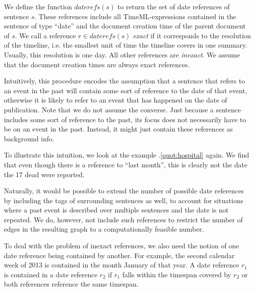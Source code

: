 \documentclass[a4paper,BCOR=10mm]{report}
\numberwithin{lemma}{chapter}
\numberwithin{definition}{chapter}
\begin{document}
We define the function $\mathit{daterefs}(s)$ to return the set of date references of sentence $s$. These references include all TimeML-expressions \citep{timeml} contained in the sentence of type ``date'' and the document creation time of the parent document of $s$.
We call a reference $r \in \mathit{daterefs}(s)$ \textit{exact} if it corresponds to the resolution of the timeline, i.e. the smallest unit of time the timeline covers in one summary. Usually, this resolution is one day. All other references are \textit{inexact}. We assume that the document creation times are always exact references.

Intuitively, this procedure encodes the assumption that a sentence that refers to an event in the past will contain some sort of reference to the date of that event, otherwise it is likely to refer to an event that has happened on the date of publication.
Note that we do not assume the converse. Just because a sentence includes some sort of reference to the past, its focus does not necessarily have to be on an event in the past. Instead, it might just contain these references as background info.

To illustrate this intuition, we look at the example \thechapter.\ref{quot:hospital} again. We find that even though there is a reference to ``last month'', this is clearly not the date the 17 dead were reported.

Naturally, it would be possible to extend the number of possible date references by including the tags of surrounding sentences as well, to account for situations where a past event is described over multiple sentences and the date is not repeated. We do, however, not include such references to restrict the number of edges in the resulting graph to a computationally feasible number.

To deal with the problem of inexact references, we also need the notion of one date reference being contained by another. For example, the second calendar week of 2013 is contained in the month January of that year.
A date reference $r_1$ is contained in a date reference $r_2$ if $r_1$ falls within the timespan covered by $r_2$ or both references reference the same timespan.
\end{document}
